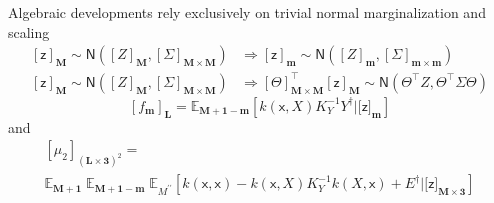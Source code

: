\documentclass[preprint,12pt]{elsarticle}
\newcommand*{\x}{\times}
\newcommand*{\mi}[1]{\mathbf{#1}}
\newcommand*{\rv}[1]{\mathsf{#1}}
\newcommand*{\te}[2][]{\left\lbrack{#2}\right\rbrack_{#1}}
\newcommand*{\tte}[2][]{\lbrack{#2}\rbrack_{#1}}
\newcommand*{\ev}[3][]{\mathbb{E}_{#3}^{#1}\!\left\lbrack{#2}\right\rbrack}
\newcommand*{\evt}[3][]{\mathbb{E}_{#3}^{#1}\!#2}
\newcommand*{\gauss}[2]{\mathsf{N}\!\left({#1,#2}\right)}
\begin{document}
    Algebraic developments rely exclusively on trivial normal marginalization and scaling
    \begin{equation} \label{eq:Notation:marginalization}
        \begin{aligned}
            \te[\mi{M}]{\rv{z}} \sim \gauss{\te[\mi{M}]{Z}}{\te[\mi{M}\x\mi{M}]{\Sigma}} &\Rightarrow
            \te[\mi{m}]{\rv{z}} \sim \gauss{\te[\mi{m}]{Z}}{\te[\mi{m}\x\mi{m}]{\Sigma}} \\
            \te[\mi{M}]{\rv{z}} \sim \gauss{\te[\mi{M}]{Z}}{\te[\mi{M}\x\mi{M}]{\Sigma}} &\Rightarrow
            \te[\mi{M}\x\mi{M}]{\Theta}^{\intercal}\te[\mi{M}]{\rv{z}} \sim \gauss{\Theta^{\intercal}Z}{\Theta^{\intercal}\Sigma\Theta}                        
        \end{aligned}
    \end{equation}
    \begin{equation} \label{eq:Notation:scaling}
    \end{equation}
        \begin{equation}
            \te[\mi{L}]{f_{\mi{m}}} = \ev{k(\rv{x},X) K_{Y}^{-1} Y^{\dagger} \big\vert \tte[\mi{m}]{\rv{z}}}{\mi{M+1-m}}
        \end{equation}
        and
        \begin{multline}
            \te[(\mi{L\x 3})^{2}]{\mu_{2}} = \\
            \evt{\;\evt{\;\ev{k(\rv{x},\rv{x}) - k(\rv{x},X) K_{Y}^{-1} k(X,\rv{x}) + E^{\dagger} \big\vert \tte[\mi{M\x 3}]{\rv{z}}}{M^{\prime\prime}}}{\mi{M+1-m}}}{\mi{M+1}}
        \end{multline}
    


 

\end{document}
